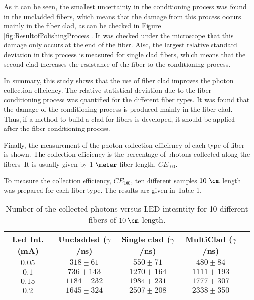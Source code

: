 As it can be seen, the smallest uncertainty in the conditioning process was found in the uncladded fibers, which means that the damage from this process occurs mainly in the fiber clad, as can be checked in Figure \ref{fig:ResultofPolishingProcess}. It was checked under the microscope that this damage only occurs at the end of the fiber. Also, the largest relative standard deviation in this process is measured for single clad fibers, which means that the second clad increases the resistance of the fiber to the conditioning process.

In summary, this study shows that the use of fiber clad improves the photon collection efficiency. The relative statistical deviation due to the fiber conditioning process was quantified for the different fiber types. It was found that the damage of the conditioning process is produced mainly in the fiber clad. Thus, if a method to build a clad for fibers is developed, it should be applied after the fiber conditioning process.

Finally, the measurement of the photon collection efficiency of each type of fiber is shown. The collection efficiency is the percentage of photons collected along the fibers. It is usually given by $1~\meter$ fiber length, $CE_ {100}$.

To measure the collection efficiency, $CE_{100}$, ten different samples $10~\cm$ length was prepared for each fiber type. The results are given in Table \ref{tab:10DifferentSamplesAlltypes}.

\begin{table}[htbp]
\begin{center}
\begin{tabular}{|c|c|c|c|c|}
\hline
Led Int. (mA) & Uncladded ($\gamma$/ns) & Single clad ($\gamma$/ns) & MultiClad ($\gamma$/ns) \\
\hline \hline \hline
$0.05$ & $318 \pm 61$ & $550 \pm 71$ & $480 \pm 84$ \\ \hline
$0.1$ & $736 \pm 143$ & $1270 \pm 164$ & $1111 \pm 193$ \\ \hline
$0.15$ & $1184 \pm 232$ & $1984 \pm 231$ & $1777\pm 307$ \\ \hline
$0.2$ & $1645 \pm 324$ & $2507 \pm 208$ & $2338 \pm 350$ \\ \hline
\end{tabular}
\caption{Number of the collected photons versus LED intesntity for 10 different fibers of $10~\cm$ length.}
\label{tab:10DifferentSamplesAlltypes}
\end{center}
\end{table}

